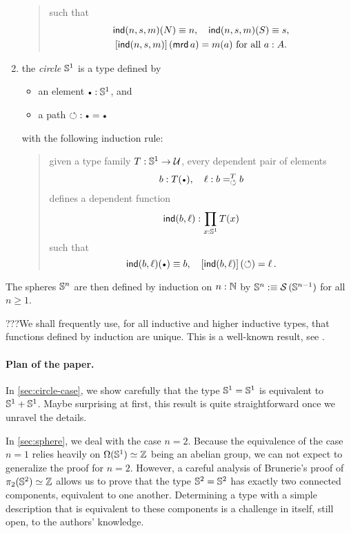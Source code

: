 \documentclass[english,a4]{article}
\renewcommand{\ap}[1]{\left[{#1}\right]}
\begin{document}
\begin{enumerate}
\begin{quote}
\begin{displaymath}
    \end{displaymath}
    such that
    \begin{gather*}
      \ind(n,s,m)(N) \jdeq n,\quad \ind(n,s,m)(S) \jdeq s,\\
      \ap{\ind(n,s,m)}(\mrd a) = m(a)\ \text{for all}\ a\from A.
    \end{gather*}
  \end{quote}
\item the {\em circle} ${{\mathbb S^{1}}}$ is a type defined by
  \begin{itemize}
  \item an element $\base \from \Sc$, and
  \item a path $\Sloop: \base = \base$
  \end{itemize}
  with the following induction rule:
  \begin{quote}
    given a type family $T: {{\mathbb S^{1}}} \to \mathcal{U}$, every dependent pair of
    elements
    \begin{displaymath}
      b\from T(\base), \quad \ell\from \pathover b T \Sloop b
    \end{displaymath}
    defines a dependent function
    \begin{displaymath}
      \operatorname{\mathsf{ind}}(b,\ell):\prod_{x: {{\mathbb S^{1}}}} T(x)
    \end{displaymath}
    such that
    \begin{displaymath}
      \ind(b,\ell)(\base) \jdeq b,\quad \ap{\ind(b,\ell)}(\Sloop) = \ell \,.
    \end{displaymath}
  \end{quote}
\end{enumerate}
The spheres ${\mathbb S^{n}}$ are then defined by induction on $n:\mathbb{N}$ by
${\mathbb S^{n}} \mathrel{\hbox{:}\mkern-5mu\equiv} \operatorname{\mathcal S} {({\mathbb S^{n-1}})}$ for all $n\geq 1$.

???We shall frequently use, for all inductive and higher inductive types,
that functions defined by induction are unique. This is a well-known
result, see \cite{XXX}.

\paragraph{Plan of the paper.}%
In \cref{sec:circle-case}, we show carefully that the type ${{\mathbb S^{1}}} = {{\mathbb S^{1}}}$
is equivalent to ${{\mathbb S^{1}}} + {{\mathbb S^{1}}}$. Maybe surprising at first, this result
is quite straightforward once we unravel the details.

In \cref{sec:sphere}, we deal with the case $n=2$. Because the
equivalence of the case $n=1$ relies heavily on $\Omega({{\mathbb S^{1}}})\simeq \mathbb{Z}$
being an abelian group, we can not expect to generalize the proof for
$n=2$. However, a careful analysis of Brunerie's proof of
$\pi_2({{\mathbb S^{2}}}) \simeq \mathbb{Z}$ allows us to prove that the type ${{\mathbb S^{2}}}={{\mathbb S^{2}}}$ has
exactly two connected components, equivalent to one another. 
Determining a type with a simple description that is
equivalent to these components is a challenge in itself, still open,
to the authors' knowledge.
\end{document}

